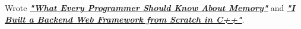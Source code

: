 





\vspace{1mm}
\begin{zitemize}
\setlength{\itemsep}{1pt}
\item Wrote \href{https://dev.to/hamzahassanain0/what-every-programmer-should-know-about-memory-part-1-385e}{\underline{\textbf{\textit{"What Every Programmer Should Know About Memory"}}}} and \href{https://dev.to/hamzahassanain0/i-built-a-backend-web-framework-from-scratch-in-c-41n8}{\underline{\textbf{\textit{"I Built a Backend Web Framework from Scratch in C++"}}}}.
\end{zitemize}